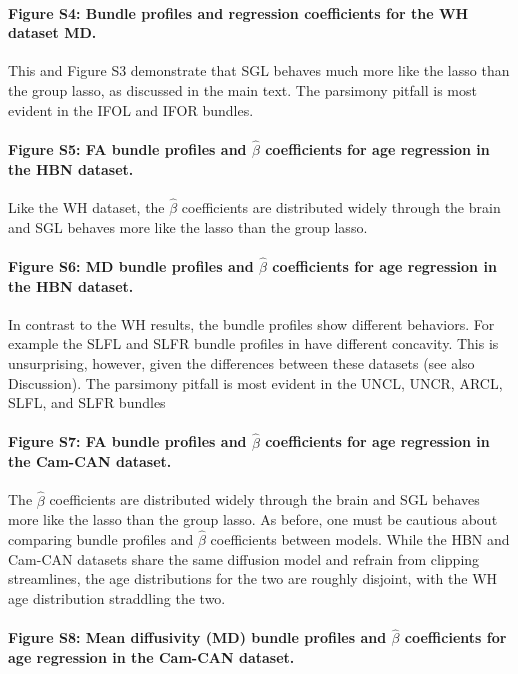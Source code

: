 \documentclass[10pt,letterpaper]{article}
\begin{document}
\paragraph*{Figure S4: Bundle profiles and regression coefficients for the WH
dataset MD.} This and Figure S3 demonstrate that SGL behaves much more like the
lasso than the group lasso, as discussed in the main text. The parsimony pitfall
is most evident in the IFOL and IFOR bundles.

\paragraph*{Figure S5: FA bundle profiles and $\hat{\beta}$ coefficients for age
regression in the HBN dataset.} Like the WH dataset, the $\hat{\beta}$
coefficients are distributed widely through the brain and SGL behaves more like
the lasso than the group lasso.

\paragraph*{Figure S6: MD bundle profiles and $\hat{\beta}$ coefficients for age
regression in the HBN dataset.} In contrast to the WH results, the bundle
profiles show different behaviors. For example the SLFL and SLFR bundle profiles
in have different concavity. This is unsurprising, however, given the
differences between these datasets (see also Discussion). The parsimony pitfall
is most evident in the UNCL, UNCR, ARCL, SLFL, and SLFR bundles

\paragraph*{Figure S7: FA bundle profiles and $\hat{\beta}$ coefficients for age
regression in the Cam-CAN dataset.} The $\hat{\beta}$ coefficients are
distributed widely through the brain and SGL behaves more like the lasso than
the group lasso. As before, one must be cautious about comparing bundle profiles
and $\hat{\beta}$ coefficients between models. While the HBN and Cam-CAN
datasets share the same diffusion model and refrain from clipping streamlines,
the age distributions for the two are roughly disjoint, with the WH age
distribution straddling the two.

\paragraph*{Figure S8: Mean diffusivity (MD) bundle profiles and $\hat{\beta}$
coefficients for age regression in the Cam-CAN dataset.}
\end{document}
